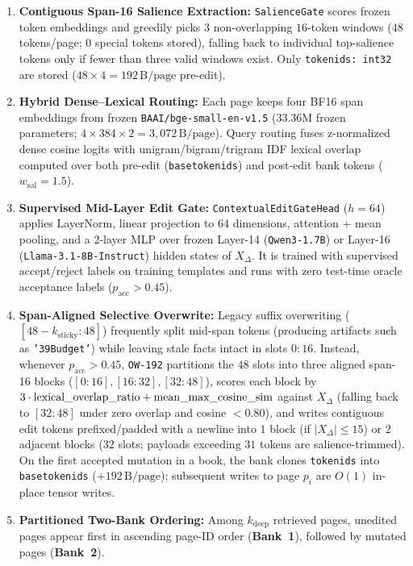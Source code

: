 \documentclass[10pt]{article}
\renewcommand{\_}{\origunderscore\allowbreak}
\begin{document}
\begin{enumerate}
    \item \textbf{Contiguous Span-16 Salience Extraction:} \texttt{SalienceGate} scores frozen token embeddings and greedily picks $3$ non-overlapping $16$-token windows ($48$ tokens/page; $0$ special tokens stored), falling back to individual top-salience tokens only if fewer than three valid windows exist. Only \texttt{token\_ids: int32} are stored ($48 \times 4 = 192\,\text{B/page}$ pre-edit).
    \item \textbf{Hybrid Dense--Lexical Routing:} Each page keeps four BF16 span embeddings from frozen \texttt{BAAI/bge-small-en-v1.5} ($33.36\text{M}$ frozen parameters; $4 \times 384 \times 2 = 3{,}072\,\text{B/page}$). Query routing fuses z-normalized dense cosine logits with unigram/bigram/trigram IDF lexical overlap computed over both pre-edit (\texttt{base\_token\_ids}) and post-edit bank tokens ($w_{\text{sal}} = 1.5$).
    \item \textbf{Supervised Mid-Layer Edit Gate:} \texttt{ContextualEditGateHead} ($h=64$) applies LayerNorm, linear projection to $64$ dimensions, attention + mean pooling, and a 2-layer MLP over frozen Layer-14 (\texttt{Qwen3-1.7B}) or Layer-16 (\texttt{Llama-3.1-8B-Instruct}) hidden states of $X_\Delta$. It is trained with supervised accept/reject labels on training templates and runs with zero test-time oracle acceptance labels ($p_{\text{acc}} > 0.45$).
    \item \textbf{Span-Aligned Selective Overwrite:} Legacy suffix overwriting ($[48-k_{\text{sticky}}:48]$) frequently split mid-span tokens (producing artifacts such as \texttt{'39Budget'}) while leaving stale facts intact in slots $0{:}16$. Instead, whenever $p_{\text{acc}} > 0.45$, \texttt{OW-192} partitions the $48$ slots into three aligned span-16 blocks ($[0{:}16], [16{:}32], [32{:}48]$), scores each block by $3\cdot \text{lexical\_overlap\_ratio} + \text{mean\_max\_cosine\_sim}$ against $X_\Delta$ (falling back to $[32{:}48]$ under zero overlap and cosine $< 0.80$), and writes contiguous edit tokens prefixed/padded with a newline into $1$ block (if $|X_\Delta| \le 15$) or $2$ adjacent blocks ($32$ slots; payloads exceeding $31$ tokens are salience-trimmed). On the first accepted mutation in a book, the bank clones \texttt{token\_ids} into \texttt{base\_token\_ids} ($+192\,\text{B/page}$); subsequent writes to page $p_i$ are $O(1)$ in-place tensor writes.
    \item \textbf{Partitioned Two-Bank Ordering:} Among $k_{\text{deep}}$ retrieved pages, unedited pages appear first in ascending page-ID order (\textbf{Bank~1}), followed by mutated pages (\textbf{Bank~2}).
\end{enumerate}
\end{document}
